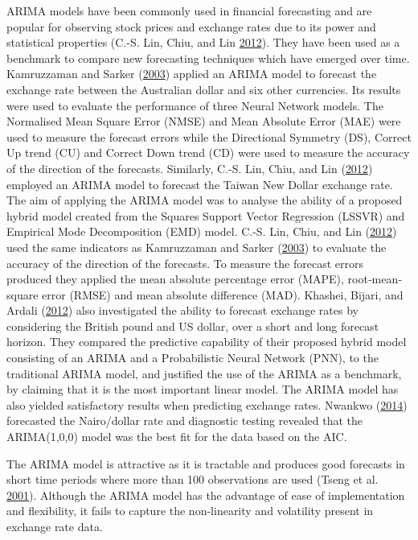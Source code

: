 \documentclass[12pt,preprint, authoryear]{elsarticle}
\numberwithin{equation}{section}
\numberwithin{figure}{section}
\numberwithin{table}{section}
\begin{document}
ARIMA models have been commonly used in financial forecasting and are
popular for observing stock prices and exchange rates due to its power
and statistical properties (C.-S. Lin, Chiu, and Lin
\protect\hyperlink{ref-lin2012}{2012}). They have been used as a
benchmark to compare new forecasting techniques which have emerged over
time. Kamruzzaman and Sarker
(\protect\hyperlink{ref-kamruzzaman2003}{2003}) applied an ARIMA model
to forecast the exchange rate between the Australian dollar and six
other currencies. Its results were used to evaluate the performance of
three Neural Network models. The Normalised Mean Square Error (NMSE) and
Mean Absolute Error (MAE) were used to measure the forecast errors while
the Directional Symmetry (DS), Correct Up trend (CU) and Correct Down
trend (CD) were used to measure the accuracy of the direction of the
forecasts. Similarly, C.-S. Lin, Chiu, and Lin
(\protect\hyperlink{ref-lin2012}{2012}) employed an ARIMA model to
forecast the Taiwan New Dollar exchange rate. The aim of applying the
ARIMA model was to analyse the ability of a proposed hybrid model
created from the Squares Support Vector Regression (LSSVR) and Empirical
Mode Decomposition (EMD) model. C.-S. Lin, Chiu, and Lin
(\protect\hyperlink{ref-lin2012}{2012}) used the same indicators as
Kamruzzaman and Sarker (\protect\hyperlink{ref-kamruzzaman2003}{2003})
to evaluate the accuracy of the direction of the forecasts. To measure
the forecast errors produced they applied the mean absolute percentage
error (MAPE), root‐mean‐square error (RMSE) and mean absolute difference
(MAD). Khashei, Bijari, and Ardali
(\protect\hyperlink{ref-khashei2012}{2012}) also investigated the
ability to forecast exchange rates by considering the British pound and
US dollar, over a short and long forecast horizon. They compared the
predictive capability of their proposed hybrid model consisting of an
ARIMA and a Probabilistic Neural Network (PNN), to the traditional ARIMA
model, and justified the use of the ARIMA as a benchmark, by claiming
that it is the most important linear model. The ARIMA model has also
yielded satisfactory results when predicting exchange rates. Nwankwo
(\protect\hyperlink{ref-nwankwo2014}{2014}) forecasted the Nairo/dollar
rate and diagnostic testing revealed that the ARIMA(1,0,0) model was the
best fit for the data based on the AIC.

The ARIMA model is attractive as it is tractable and produces good
forecasts in short time periods where more than 100 observations are
used (Tseng et al. \protect\hyperlink{ref-tseng2001}{2001}). Although
the ARIMA model has the advantage of ease of implementation and
flexibility, it fails to capture the non-linearity and volatility
present in exchange rate data.
\end{document}
